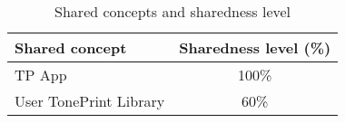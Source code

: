 \begin{table}[H]
	\centering
	\begin{tabular}[width=\textwidth]{|l|c|}
	\hline
	Shared concept & Sharedness level (\%) \\ \hline
	TP App & 100\% \\ 
	User TonePrint Library & 60\% \\ \hline
	\end{tabular}
	\caption{Shared concepts and sharedness level}
	\label{tab:SharedConcept}
\end{table}














